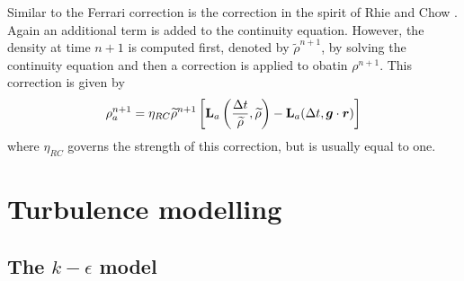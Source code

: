 Similar to the Ferrari correction is the correction in the spirit of
Rhie and Chow . Again an additional term is added to the
continuity equation. However, the density at time $n+1$ is computed
first, denoted by $\widetilde{\rho}^{n+1}$, by solving the continuity
equation and then a correction is applied to obatin $\rho^{n+1}$. This
correction is given by
\begin{equation}
\rho_a^{n+1} = \eta_{RC} \widetilde{\rho}^{n+1} \left[ \textbf{L}_a\left(
\frac{\Delta t}{\widetilde{\rho}}, \widetilde{\rho}
\right) - \textbf{L}_a (\Delta t, \bm{g}\cdot\bm{r})\right]
\label{e:rc}
\end{equation}
where $\eta_{RC}$ governs the strength of this correction, but is
usually equal to one.


\section{Turbulence modelling}

\subsection{The $k-\epsilon$ model}

